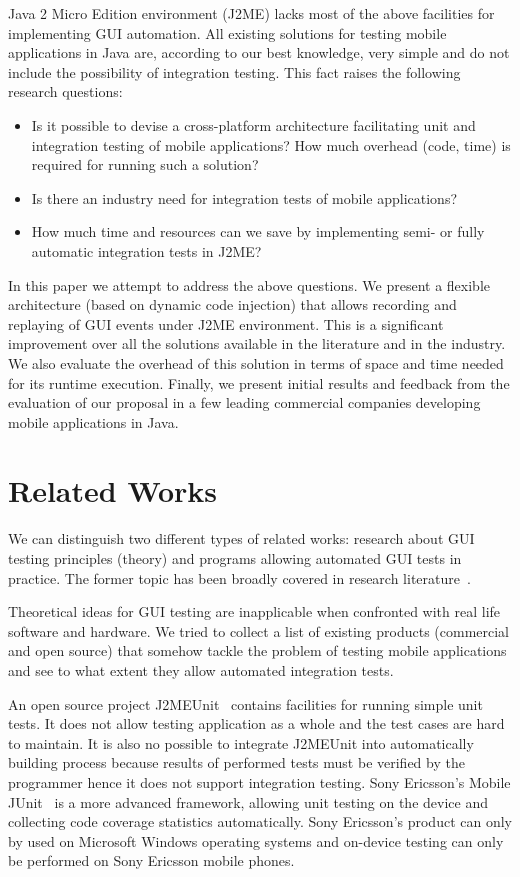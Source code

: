 \documentclass[a4paper,10pt,oneside,final]{dweiss-technote}
\renewcommand{\textsc}[1]{{\scriptsize \MakeUppercase{#1}}}
\newcommand{\jme}{\textsc{j2me}}
\begin{document}
Java 2 Micro Edition environment (\jme{}) lacks most of the above facilities for implementing
\textsc{gui} automation. All existing solutions for testing mobile applications in Java are,
according to our best knowledge, very simple and do not include the possibility of integration
testing. This fact raises the following research questions:
%
\begin{itemize}
    \item Is it possible to devise a cross-platform architecture facilitating unit and integration
    testing of mobile applications? How much overhead (code, time) is required for running such a solution?
    \item Is there an industry need for integration tests of mobile applications?
    \item How much time and resources can we save by implementing semi- or fully automatic
    integration tests in \jme{}?
\end{itemize}

In this paper we attempt to address the above questions. We present a flexible architecture (based
on dynamic code injection) that allows recording and replaying of \textsc{gui} events under \jme{}
environment. This is a significant improvement over all the solutions available in the literature and in the
industry. We also evaluate the overhead of this solution in terms of space and time needed for its
runtime execution. Finally, we present initial results and feedback from the evaluation of our
proposal in a few leading commercial companies developing mobile applications in Java.


\section{Related Works}

We can distinguish two different types of related works: research about
\textsc{gui} testing principles (theory) and programs allowing automated \textsc{gui}
tests in practice. The former topic has been broadly covered in research literature~\cite{tcs,softqualiteng,emost}.

Theoretical ideas for \textsc{gui} testing are inapplicable when confronted with
real life software and hardware. We tried to collect a list of existing products (commercial and 
open source) that somehow tackle the problem of testing mobile applications and see to what
extent they allow automated integration tests.

An open source project J2MEUnit~\cite{j2meunit} contains facilities for running simple unit tests.
It does not allow testing application as a whole and the test cases are hard to maintain. It is also
no possible to integrate J2MEUnit into automatically building process because results of performed
tests must be verified by the programmer hence it does not support integration testing. Sony
Ericsson's Mobile JUnit~\cite{mobilejunit} is a more advanced framework, allowing unit testing on
the device and collecting code coverage statistics automatically. Sony Ericsson's product can only
by used on Microsoft Windows operating systems and on-device testing can only be performed on Sony
Ericsson mobile phones.
\end{document}
